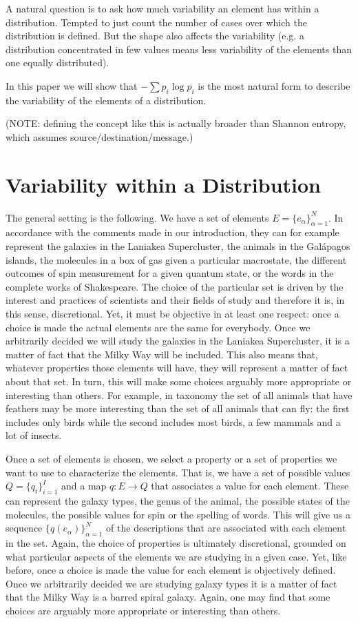 \documentclass{article}
\begin{document}
A natural question is to ask how much variability an element has within a distribution. Tempted to just count the number of cases over which the distribution is defined. But the shape also affects the variability (e.g. a distribution concentrated in few values means less variability of the elements than one equally distributed).

In this paper we will show that $- \sum p_i \log p_i$ is the most natural form to describe the variability of the elements of a distribution.

(NOTE: defining the concept like this is actually broader than Shannon entropy, which assumes source/destination/message.)

\section{Variability within a Distribution\label{vwd}}

The general setting is the following. We have a set of elements $E = \{e_\alpha\}_{\alpha=1}^N$. In accordance with the comments made in our introduction, they can for example represent the galaxies in the Laniakea Supercluster, the animals in the Gal\'{a}pagos islands, the molecules in a box of gas given a particular macrostate, the different outcomes of spin measurement for a given quantum state, or the words in the complete works of Shakespeare. The choice of the particular set is driven by the interest and practices of scientists and their fields of study and therefore it is, in this sense, discretional. Yet, it must be objective in at least one respect: once a choice is made the actual elements are the same for everybody. Once we arbitrarily decided we will study the galaxies in the Laniakea Supercluster, it is a matter of fact that the Milky Way will be included. This also means that, whatever properties those elements will have, they will represent a matter of fact about that set. In turn, this will make some choices arguably more appropriate or interesting than others. For example, in taxonomy the set of all animals that have feathers may be more interesting than the set of all animals that can fly: the first includes only birds while the second includes most birds, a few mammals and a lot of insects.

Once a set of elements is chosen, we select a property or a set of properties we want to use to characterize the elements. That is, we have a set of possible values $Q=\{q_i\}_{i=1}^I$ and a map $q : E \to Q$ that associates a value for each element. These can represent the galaxy types, the genus of the animal, the possible states of the molecules, the possible values for spin or the spelling of words. This will give us a sequence $\{q(e_\alpha)\}_{\alpha=1}^N$ of the descriptions that are associated with each element in the set. Again, the choice of properties is ultimately discretional, grounded on what particular aspects of the elements we are studying in a given case. Yet, like before, once a choice is made the value for each element is objectively defined. Once we arbitrarily decided we are studying galaxy types it is a matter of fact that the Milky Way is a barred spiral galaxy. Again, one may find that some choices are arguably more appropriate or interesting than others.
\end{document}
